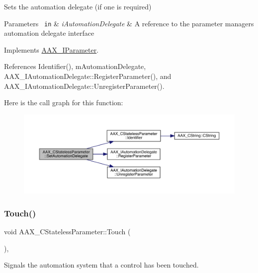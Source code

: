 Sets the automation delegate (if one is required) 


\begin{DoxyParams}[1]{Parameters}
\mbox{\texttt{ in}}  & {\em i\+Automation\+Delegate} & A reference to the parameter manager\textquotesingle{}s automation delegate interface \\
\hline
\end{DoxyParams}


Implements \mbox{\hyperlink{a01857_a2c3dfdce09a2652f954ea6e4f9e12797}{A\+A\+X\+\_\+\+I\+Parameter}}.



References Identifier(), m\+Automation\+Delegate, A\+A\+X\+\_\+\+I\+Automation\+Delegate\+::\+Register\+Parameter(), and A\+A\+X\+\_\+\+I\+Automation\+Delegate\+::\+Unregister\+Parameter().

Here is the call graph for this function\+:
\nopagebreak
\begin{figure}[H]
\begin{center}
\leavevmode
\includegraphics[width=350pt]{a01541_acaf1f39e881c14fb3b81f9c0c23fea31_cgraph}
\end{center}
\end{figure}
\mbox{\label{a01541_a91eda962cdbf1e211a396240c23c0330}} 
\subsubsection{\texorpdfstring{Touch()}{Touch()}}
{\footnotesize\ttfamily void A\+A\+X\+\_\+\+C\+Stateless\+Parameter\+::\+Touch (\begin{DoxyParamCaption}{ }\end{DoxyParamCaption})\hspace{0.3cm}{\ttfamily [inline]}, {\ttfamily [virtual]}}



Signals the automation system that a control has been touched. 

